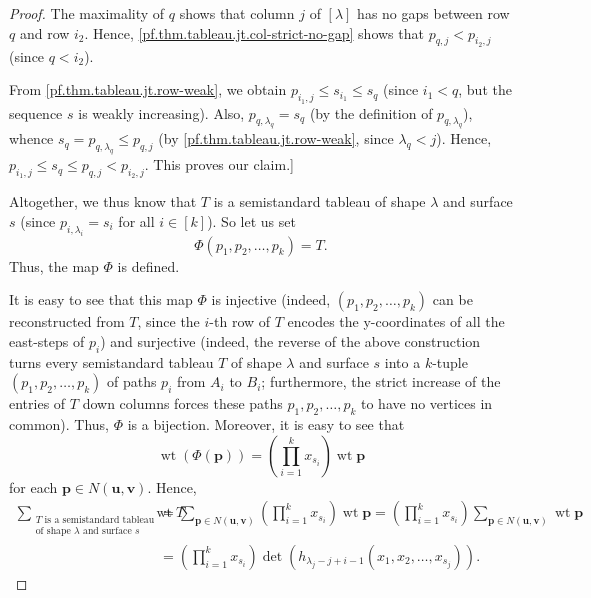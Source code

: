 \documentclass[reqno]{amsart}%
\newcommand{\0}{\phantom{c}}
\let\sumnonlimits\sum
\let\prodnonlimits\prod
\renewcommand{\sum}{\sumnonlimits\limits}
\renewcommand{\prod}{\prodnonlimits\limits}
\theoremstyle{plain}
\theoremstyle{definition}
\numberwithin{equation}{section}
\begin{document}
\begin{proof}
The maximality of $q$ shows that column $j$ of $\left[  \lambda\right]  $ has
no gaps between row $q$ and row $i_{2}$. Hence,
\eqref{pf.thm.tableau.jt.col-strict-no-gap} shows that $p_{q,j}<p_{i_{2},j}$
(since $q<i_{2}$).

From \eqref{pf.thm.tableau.jt.row-weak}, we obtain $p_{i_{1},j}\leq s_{i_{1}%
}\leq s_{q}$ (since $i_{1}<q$, but the sequence $s$ is weakly increasing).
Also, $p_{q,\lambda_{q}}=s_{q}$ (by the definition of $p_{q,\lambda_{q}}$),
whence $s_{q}=p_{q,\lambda_{q}}\leq p_{q,j}$ (by
\eqref{pf.thm.tableau.jt.row-weak}, since $\lambda_{q}<j$). Hence,
$p_{i_{1},j}\leq s_{q}\leq p_{q,j}<p_{i_{2},j}$. This proves our claim.]

Altogether, we thus know that $T$ is a semistandard tableau of shape $\lambda$
and surface $s$ (since $p_{i,\lambda_{i}}=s_{i}$ for all $i\in\left[
k\right]  $). So let us set%
\[
\Phi\left(  p_{1},p_{2},\ldots,p_{k}\right)  =T.
\]
Thus, the map $\Phi$ is defined.

It is easy to see that this map $\Phi$ is injective (indeed, $\left(
p_{1},p_{2},\ldots,p_{k}\right)  $ can be reconstructed from $T$, since the
$i$-th row of $T$ encodes the y-coordinates of all the east-steps of $p_{i}$)
and surjective (indeed, the reverse of the above construction turns every
semistandard tableau $T$ of shape $\lambda$ and surface $s$ into a $k$-tuple
$\left(  p_{1},p_{2},\ldots,p_{k}\right)  $ of paths $p_{i}$ from $A_{i}$ to
$B_{i}$; furthermore, the strict increase of the entries of $T$ down columns
forces these paths $p_{1},p_{2},\ldots,p_{k}$ to have no vertices in common).
Thus, $\Phi$ is a bijection. Moreover, it is easy to see that
\[
\operatorname*{wt}\left(  \Phi\left(  \mathbf{p}\right)  \right)  =\left(
\prod_{i=1}^{k}x_{s_{i}}\right)  \operatorname*{wt}\mathbf{p}%
\]
for each $\mathbf{p}\in N\left(  \mathbf{u},\mathbf{v}\right)  $. Hence,%
\begin{align*}
\sum_{\substack{T\text{ is a semistandard tableau}\\\text{of shape }%
\lambda\text{ and surface }s}}\operatorname*{wt}T  &  =\sum_{\mathbf{p}\in
N\left(  \mathbf{u},\mathbf{v}\right)  }\left(  \prod_{i=1}^{k}x_{s_{i}%
}\right)  \operatorname*{wt}\mathbf{p}=\left(  \prod_{i=1}^{k}x_{s_{i}%
}\right)  \sum_{\mathbf{p}\in N\left(  \mathbf{u},\mathbf{v}\right)
}\operatorname*{wt}\mathbf{p}\\
&  =\left(  \prod_{i=1}^{k}x_{s_{i}}\right)  \det\left(  h_{\lambda_{j}%
-j+i-1}\left(  x_{1},x_{2},\ldots,x_{s_{j}}\right)  \right)  .
\end{align*}

\end{proof}
\end{document}
